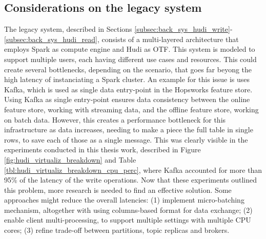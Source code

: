 \subsection{Considerations on the legacy system}
The legacy system, described in Sections \ref{subsec:back_sys_hudi_write}-\ref{subsec:back_sys_hudi_read}, consists of a multi-layered architecture that employs Spark as compute engine and Hudi as \gls{OTF}. This system is modeled to support multiple users, each having different use cases and resources. This could create several bottlenecks, depending on the scenario, that goes far beyong the high latency of instanciating a Spark cluster. An example for this issue is uses Kafka, which is used as single data entry-point in the Hopsworks feature store. Using Kafka as single entry-point ensures data consistency between the online feature store, working with streaming data, and the offline feature store, working on batch data. However, this creates a performance bottleneck for this infrastructure as data increases, needing to make a piece the full table in single rows, to save each of those as a single message. This was clearly visible in the experiments conducted in this thesis work, described in Figure \ref{fig:hudi_virtualiz_breakdown} and Table \ref{tbl:hudi_virtualiz_breakdown_cpu_perc}, where Kafka accounted for more than 95\% of the latency of the write operations. Now that these experiments outlined this problem, more research is needed to find an effective solution. Some approaches might reduce the overall latencies: (1) implement micro-batching mechanism, altogether with using columns-based format for data exchange; (2) enable client multi-processing, to support multiple settings with multiple \gls{CPU} cores; (3) refine trade-off between partitions, topic replicas and brokers.



